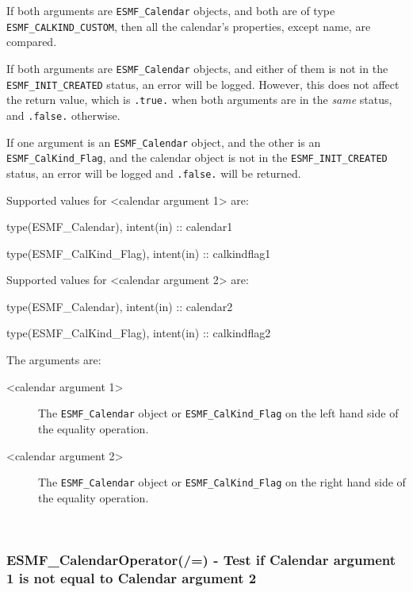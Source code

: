        If both arguments are {\tt ESMF\_Calendar} objects, and both are of  
       type {\tt ESMF\_CALKIND\_CUSTOM}, then all the calendar's properties, 
       except name, are compared.
  
       If both arguments are {\tt ESMF\_Calendar} objects, and either of them
       is not in the {\tt ESMF\_INIT\_CREATED} status, an error will be logged.
       However, this does not affect the return value, which is {\tt .true.} 
       when both arguments are in the {\em same} status, and {\tt .false.}
       otherwise.
  
       If one argument is an {\tt ESMF\_Calendar} object, and the other is an
       {\tt ESMF\_CalKind\_Flag}, and the calendar object is not in the
       {\tt ESMF\_INIT\_CREATED} status, an error will be logged and
       {\tt .false.} will be returned.
  
       Supported values for <calendar argument 1> are:
       \begin{description}
       \item type(ESMF\_Calendar),     intent(in) :: calendar1
       \item type(ESMF\_CalKind\_Flag), intent(in) :: calkindflag1
       \end{description}
       Supported values for <calendar argument 2> are:
       \begin{description}
       \item type(ESMF\_Calendar),     intent(in) :: calendar2
       \item type(ESMF\_CalKind\_Flag), intent(in) :: calkindflag2
       \end{description}
  
       The arguments are:
       \begin{description}   
       \item[<calendar argument 1>]
            The {\tt ESMF\_Calendar} object or {\tt ESMF\_CalKind\_Flag} on the
            left hand side of the equality operation.
       \item[<calendar argument 2>]
            The {\tt ESMF\_Calendar} object or {\tt ESMF\_CalKind\_Flag} on the
            right hand side of the equality operation.
       \end{description}
   
 
\mbox{}\hrulefill\ 
 
\subsubsection [ESMF\_CalendarOperator(/=)] {ESMF\_CalendarOperator(/=) - Test if Calendar argument 1 is not equal to Calendar argument 2}


